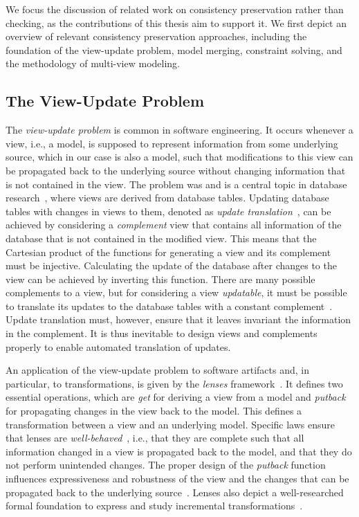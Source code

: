 We focus the discussion of related work on consistency preservation rather than checking, as the contributions of this thesis aim to support it.
We first depict an overview of relevant consistency preservation approaches, including the foundation of the view-update problem, model merging, constraint solving, and the methodology of multi-view modeling.


\subsection{The View-Update Problem}

The \emph{view-update problem} is common in software engineering.
It occurs whenever a view, i.e., a model, is supposed to represent information from some underlying source, which in our case is also a model, such that modifications to this view can be propagated back to the underlying source without changing information that is not contained in the view.
The problem was and is a central topic in database research~\cite{bancilhon1981viewUpdate-TDS, dayal1982viewUpdate-TDS}, where views are derived from database tables.
Updating database tables with changes in views to them, denoted as \emph{update translation}~\cite{bancilhon1981viewUpdate-TDS}, can be achieved by considering a \emph{complement} view that contains all information of the database that is not contained in the modified view.
This means that the Cartesian product of the functions for generating a view and its complement must be injective.
Calculating the update of the database after changes to the view can be achieved by inverting this function.
There are many possible complements to a view, but for considering a view \emph{updatable}, it must be possible to translate its 
updates to the database tables with a constant complement~\cite{bancilhon1981viewUpdate-TDS}.
Update translation must, however, ensure that it leaves invariant the information in the complement.
It is thus inevitable to design views and complements properly to enable automated translation of updates.

An application of the view-update problem to software artifacts and, in particular, to transformations, is given by the \emph{lenses} framework~\cite{foster2005Combinators-POPL, foster2007combinators-TPLS}.
It defines two essential operations, which are \emph{get} for deriving a view from a model and \emph{putback} for propagating changes in the view back to the model.
This defines a transformation between a view and an underlying model.
Specific laws ensure that lenses are \emph{well-behaved}~\cite[Def.~3.2]{foster2007combinators-TPLS}, i.e., that they are complete such that all information changed in a view is propagated back to the model, and that they do not perform unintended changes.
The proper design of the \emph{putback} function influences expressiveness and robustness of the view and the changes that can be propagated back to the underlying source~\cite{foster2007combinators-TPLS}.
Lenses also depict a well-researched formal foundation to express and study incremental transformations~\cite{stevens2008bxalgebraic-ICGT}.

